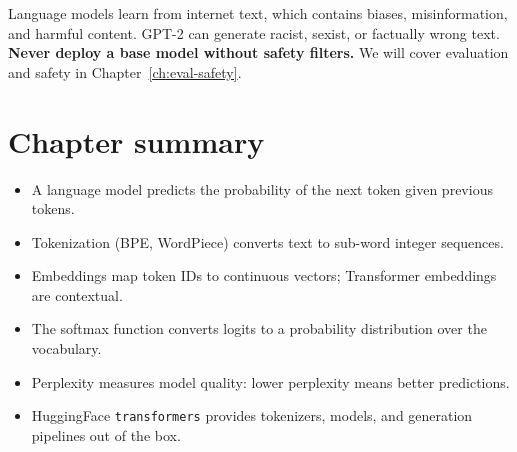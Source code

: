 \begin{ethicsbox}
Language models learn from internet text, which contains biases, misinformation, and harmful content. GPT-2 can generate racist, sexist, or factually wrong text. \textbf{Never deploy a base model without safety filters.} We will cover evaluation and safety in Chapter~\ref{ch:eval-safety}.
\end{ethicsbox}

\section{Chapter summary}

\begin{itemize}
  \item A language model predicts the probability of the next token given previous tokens.
  \item Tokenization (BPE, WordPiece) converts text to sub-word integer sequences.
  \item Embeddings map token IDs to continuous vectors; Transformer embeddings are contextual.
  \item The softmax function converts logits to a probability distribution over the vocabulary.
  \item Perplexity measures model quality: lower perplexity means better predictions.
  \item HuggingFace \texttt{transformers} provides tokenizers, models, and generation pipelines out of the box.
\end{itemize}
